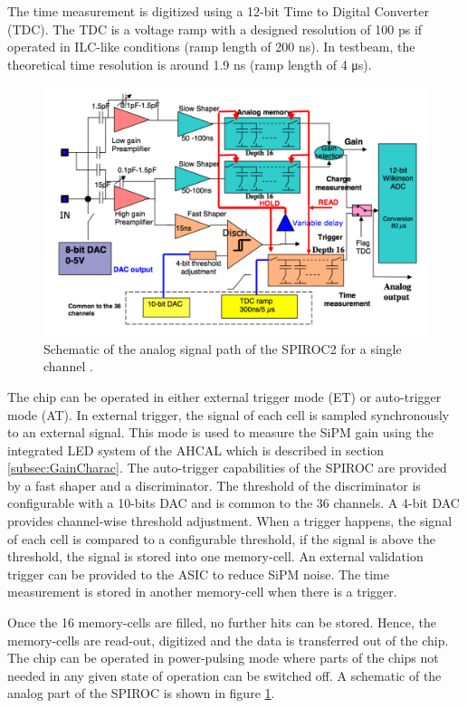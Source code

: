 The time measurement is digitized using a 12-bit Time to Digital Converter (TDC). The TDC is a voltage ramp with a designed resolution of 100 ps if operated in ILC-like conditions (ramp length of 200 \si{\nano\second}). In testbeam, the theoretical time resolution is around 1.9 ns (ramp length of 4 \si{\micro\second}).

\begin{figure}[htbp!]
  \centering
  \includegraphics[width=0.7\linewidth]{chap3/fig/SPIROC2B_schematic.png}
  \caption{Schematic of the analog signal path of the SPIROC2 for a single channel \cite{SPIROC2_datasheet}.} \label{fig:SPIROC2B_sche}
\end{figure}

The chip can be operated in either external trigger mode (ET) or auto-trigger mode (AT). In external trigger, the signal of each cell is sampled synchronously to an external signal. This mode is used to measure the SiPM gain using the integrated LED system of the AHCAL which is described in section \ref{subsec:GainCharac}. The auto-trigger capabilities of the SPIROC are provided by a fast shaper and a discriminator. The threshold of the discriminator is configurable with a 10-bits DAC and is common to the 36 channels. A 4-bit DAC provides channel-wise threshold adjustment. When a trigger happens, the signal of each cell is compared to a configurable threshold, if the signal is above the threshold, the signal is stored into one memory-cell. An external validation trigger can be provided to the ASIC to reduce SiPM noise. The time measurement is stored in another memory-cell when there is a trigger.

Once the 16 memory-cells are filled, no further hits can be stored. Hence, the memory-cells are read-out, digitized and the data is transferred out of the chip. The chip can be operated in power-pulsing mode where parts of the chips not needed in any given state of operation can be switched off. A schematic of the analog part of the SPIROC is shown in figure \ref{fig:SPIROC2B_sche}.

